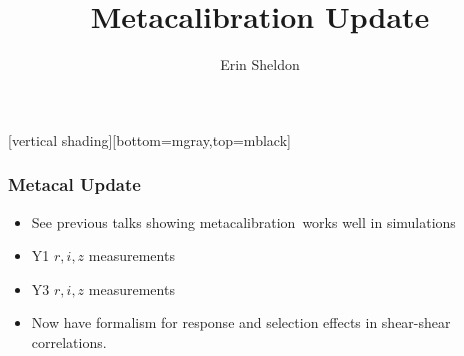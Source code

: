 \documentclass{beamer}
\title{Metacalibration Update}
\author{Erin Sheldon}
\institute{Brookhaven National Laboratory}
\newcommand{\mcal}{metacalibration}
\begin{document}
\frame{\titlepage}


[vertical shading][bottom=mgray,top=mblack]



\frame
{
    \frametitle{Metacal Update}

    \begin{itemize}

        \item See previous talks showing \mcal\ works well in simulations

        \item Y1 $r,i,z$ measurements
        \item Y3 $r,i,z$ measurements
        \item Now have formalism for response and selection effects in
            shear-shear correlations.

    \end{itemize}
}
\end{document}
